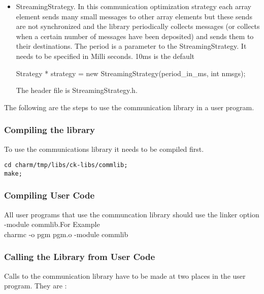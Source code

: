 \begin{itemize}
\item StreamingStrategy. In this communication optimization strategy 
each array element sends many small messages to other array elements
but these sends are not synchronized and the library periodically
collects messages (or collects when a certain number of messages have
been deposited) and sends them to their destinations. The period is a
parameter to the StreamingStrategy. It needs to be specified in Milli
seconds. 10ms is the default

Strategy * strategy = new StreamingStrategy(period\_in\_ms, int nmsgs);

The header file is StreamingStrategy.h.

\end{itemize}

The following are the steps to use the communication library 
in a user program.

\subsubsection{Compiling the library}

To use the communications library it needs to be compiled first.

\begin{verbatim}
cd charm/tmp/libs/ck-libs/commlib;
make;
\end{verbatim}

\subsubsection{Compiling User Code}
All user programs that use the communcation library should use the
linker option -module commlib.For Example \\ 
charmc -o pgm pgm.o -module commlib

\subsubsection {Calling the Library from User Code}
Calls to the communication library have to be made at two places in
the user program. They are :

